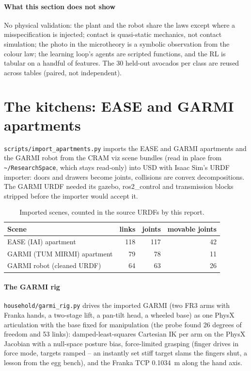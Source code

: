 \documentclass[10.5pt,a4paper]{article}
\begin{document}
\paragraph{What this section does not show} No physical validation: the plant and the robot share the laws except
where a misspecification is injected; contact is quasi-static mechanics, not contact simulation; the photo in the
microtheory is a symbolic observation from the colour law; the learning loop's agents are scripted functions, and the
RL is tabular on a handful of features. The 30 held-out avocados per class are reused across tables (paired, not
independent).
\clearpage\section{The kitchens: EASE and GARMI apartments}\label{sec:kitchen}
\texttt{scripts/import\_apartments.py} imports the EASE and GARMI apartments and the GARMI robot from the CRAM viz
scene bundles (read in place from \texttt{\textasciitilde/ResearchSpace}, which stays read-only) into USD with Isaac
Sim's URDF importer: doors and drawers become joints, collisions are convex decompositions. The GARMI URDF needed its
gazebo, ros2\_control and transmission blocks stripped before the importer would accept it.
\begin{table}[htbp]\centering\footnotesize\caption{Imported scenes, counted in the source URDFs by this report.}
\begin{tabularx}{\linewidth}{@{}Xrrr@{}}\toprule Scene & links & joints & movable joints \\\midrule
EASE (IAI) apartment & 118 & 117 & 42 \\
GARMI (TUM MIRMI) apartment & 79 & 78 & 11 \\
GARMI robot (cleaned URDF) & 64 & 63 & 26 \\\bottomrule\end{tabularx}\end{table}
\paragraph{The GARMI rig} \texttt{household/garmi\_rig.py} drives the imported GARMI (two FR3 arms with Franka
hands, a two-stage lift, a pan-tilt head, a wheeled base) as one PhysX articulation with the base fixed for
manipulation (the probe found 26 degrees of freedom and 53 links): damped-least-squares Cartesian IK per arm on the PhysX Jacobian with a null-space posture bias,
force-limited grasping (finger drives in force mode, targets ramped -- an instantly set stiff target slams the
fingers shut, a lesson from the egg bench), and the Franka TCP 0.1034~m along the hand axis.
\end{document}
